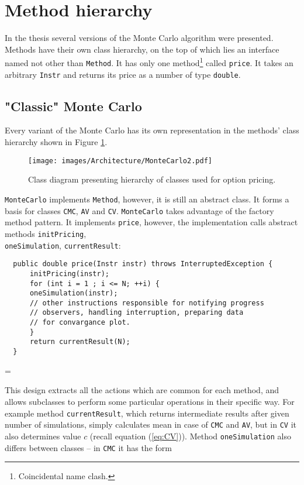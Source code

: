 \documentclass[a4paper,11pt, twoside]{book}
\newenvironment{absolutelynopagebreak}
  {\par\nobreak\vfill\penalty0\vfilneg
   \vtop\bgroup}
  {\par\xdef\tpd{\the\prevdepth}\egroup
   \prevdepth=\tpd}
\theoremstyle{definition}
\theoremstyle{remark}
\newcounter{example}[chapter]
\begin{document}
\section{Method hierarchy}
In the thesis several versions of the Monte Carlo algorithm were presented. Methods have their own class hierarchy, on the top of which lies an interface named not other than \texttt{Method}. It has only one method\footnote{Coincidental name clash.} called \texttt{price}. It takes an arbitrary \texttt{Instr} and returns its price as a number of type \texttt{double}.

\subsection{"Classic" Monte Carlo}
Every variant of the Monte Carlo has its own representation in the methods' class hierarchy shown in Figure \ref{fig:arch:MonteCarlo}.
\begin{figure}
\centering
 \texttt{[image: images/Architecture/MonteCarlo2.pdf]}
\caption{Class diagram presenting hierarchy of classes used for option pricing.}
\label{fig:arch:MonteCarlo}
\end{figure}

\texttt{MonteCarlo} implements \texttt{Method}, however, it is still an abstract class. It forms a basis for classes \texttt{CMC}, \texttt{AV} and \texttt{CV}. \texttt{MonteCarlo} takes advantage of the factory method pattern. It implements \texttt{price}, however, the implementation calls abstract methods \texttt{initPricing},\\ \texttt{oneSimulation}, \texttt{currentResult}:
\begin{absolutelynopagebreak}
\begin{lstlisting}
  public double price(Instr instr) throws InterruptedException {
      initPricing(instr);
      for (int i = 1 ; i <= N; ++i) {
	  oneSimulation(instr);
	  // other instructions responsible for notifying progress
	  // observers, handling interruption, preparing data
	  // for convargance plot.
      }
      return currentResult(N);
  }
\end{lstlisting}
\end{absolutelynopagebreak}
   
This design extracts all the actions which are common for each method, and allows subclasses to perform some particular operations in their specific way. For example method \texttt{currentResult}, which returns intermediate results after given number of simulations, simply calculates mean in case of \texttt{CMC} and \texttt{AV}, but in \texttt{CV} it also determines value $c$ (recall equation (\ref{eq:CV})). Method \texttt{oneSimulation} also differs between classes -- in \texttt{CMC} it has the form
\end{document}
